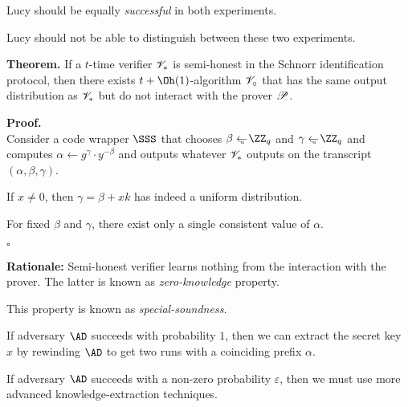 \documentclass[landscape,footrule]{foils}
\newcommand{\spreadappart}{\vspace*{\fill}}
\begin{document}
Lucy should be equally \emph{successful} in both experiments.



Lucy should not be able to distinguish between these two experiments.


\textbf{Theorem.}  If a $t$-time verifier $\mathscr{V}_*$ is semi-honest
in the Schnorr identification protocol, then there exists
$t+\Oh(1)$-algorithm $\mathscr{V}_{\circ}$ that has the same output
distribution as $\mathscr{V}_*$ but do not interact with the prover
$\mathscr{P}$.
\bigskip
\spreadappart

\textbf{Proof.}\\
Consider a code wrapper $\SSS$ that chooses $\beta\getsu\ZZ_q$ and
$\gamma\getsu\ZZ_q$ and computes $\alpha\gets g^\gamma\cdot
y^{-\beta}$ and outputs whatever $\mathscr{V}_*$ outputs on the
transcript  $(\alpha,\beta,\gamma)$.


\begin{triangles}
\item If $x\neq 0$, then $\gamma=\beta+xk$ has indeed a uniform
  distribution.
  \item For fixed $\beta$ and $\gamma$, there exist only a single consistent value of $\alpha$.
\end{triangles}
{$\square$}
\bigskip

\textbf{Rationale:}
Semi-honest verifier learns nothing from the interaction with the prover.
The latter is known as \emph{zero-knowledge} property.

 


This property is known as  \emph{special-soundness.}
\begin{triangles}
\item If adversary $\AD$ succeeds with probability $1$, then we can
  extract the secret key $x$ by rewinding $\AD$ to get two runs with a
  coinciding prefix $\alpha$.
\item If adversary $\AD$ succeeds with a non-zero probability
  $\varepsilon$, then we must use more advanced knowledge-extraction
  techniques.
\end{triangles}
\end{document}
